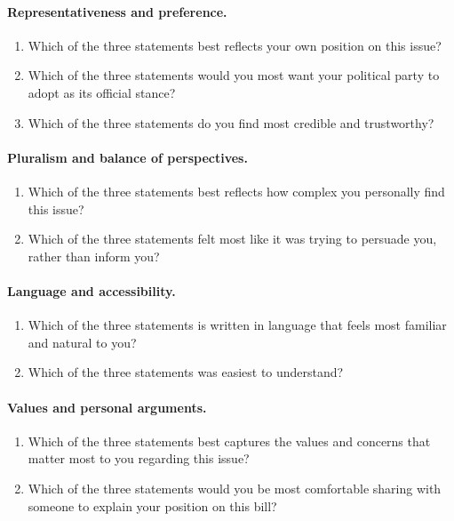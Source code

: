 \documentclass[11pt]{article}
\begin{document}
\paragraph{Representativeness and preference.}
\begin{enumerate}[label=\roman*.]
    \item Which of the three statements best reflects your own position 
    on this issue?
    \item Which of the three statements would you most want your 
    political party to adopt as its official stance?
    \item Which of the three statements do you find most credible 
    and trustworthy?
\end{enumerate}

\paragraph{Pluralism and balance of perspectives.}
\begin{enumerate}[label=\roman*., resume]
    \item Which of the three statements best reflects how complex you 
    personally find this issue?
    \item Which of the three statements felt most like it was trying 
    to persuade you, rather than inform you?
\end{enumerate}

\paragraph{Language and accessibility.}
\begin{enumerate}[label=\roman*., resume]
    \item Which of the three statements is written in language that 
    feels most familiar and natural to you?
    \item Which of the three statements was easiest to understand?
\end{enumerate}

\paragraph{Values and personal arguments.}
\begin{enumerate}[label=\roman*., resume]
    \item Which of the three statements best captures the values and 
    concerns that matter most to you regarding this issue?
    \item Which of the three statements would you be most comfortable 
    sharing with someone to explain your position on this bill?
\end{enumerate}
\end{document}
